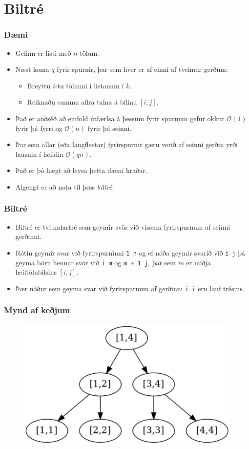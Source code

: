 \documentclass{beamer}
\begin{document}
\section[Biltré]{Biltré}

\begin{frame}
\frametitle{Dæmi}
\begin{itemize}
\item<1-> Gefinn er listi með $n$ tölum.
\item<2-> Næst koma $q$ fyrir spurnir, þar sem hver er af einni af tveimur gerðum:
	\begin{itemize}
	\item<3-> Breyttu $i$-tu tölunni í listanum í $k$.
	\item<4-> Reiknaðu summu allra talna á bilinu $[i, j]$.
	\end{itemize}
\item<5-> Það er auðséð að einföld útfærlsa á þessum fyrir spurnum gefur okkur $\mathcal{O}(1)$ fyrir þá fyrri og $\mathcal{O}(n)$ fyrir þá seinni.
\item<6-> Þar sem allar (eða langflestar) fyrirspurnir gætu verið af seinni gerðin yrði lausnin í heildin $\mathcal{O}(qn)$.
\item<7-> Það er þó hægt að leysa þetta dæmi hraðar.
\item<8-> Algengt er að nota til þess \emph{biltré}.
\end{itemize}
\end{frame}

\begin{frame}
\frametitle{Biltré}
\begin{itemize}
\item<1-> Biltré er tvíundartré sem geymir svör við vissum fyrirspurnum af seinni gerðinni.
\item<2-> Rótin geymir svar við fyrirspurninni \texttt{1 n} 
og ef nóða geymir svarið við \texttt{i j} þá geyma börn hennar svör við \texttt{i m} og \texttt{m + 1 j}, þar sem $m$ er miðja heiltölubilsins $[i, j]$.
\item<3-> Þær nóður sem geyma svar við fyrirspurnum af gerðinni \texttt{i i} eru lauf trésins.
\end{itemize}
\end{frame}

\begin{frame}
\frametitle{Mynd af keðjum}
	\begin{figure}
		\includegraphics[scale=0.5]{mynd2.png}
	\end{figure}
\end{frame}
\end{document}
